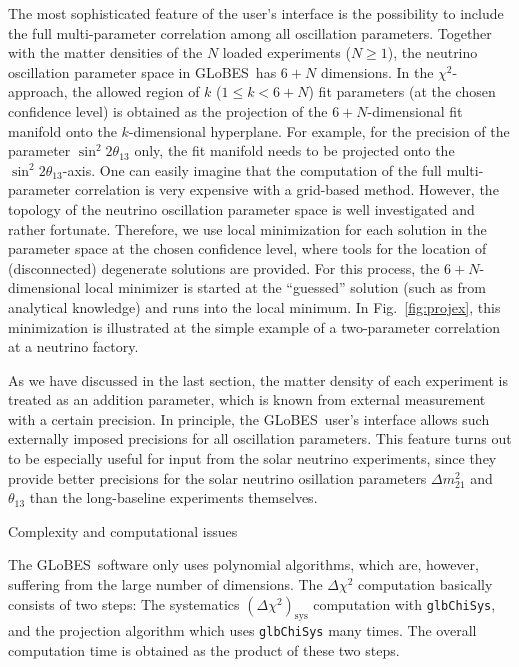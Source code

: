 \documentclass[12pt,a4paper]{article}
\makeatletter
\renewcommand{\section}{\@startsection{section}{1}{0em}{-\baselineskip}%
{\baselineskip}{\normalfont\large\bfseries}}
\newcommand{\fig}{Fig.}
\newcommand{\sdm}{\Delta m_{21}^2}
\newcommand{\stheta}{\sin^2 2 \theta_{13}}
\newcommand{\GLOBES}{{\sf GLoBES}}
\newcommand{\figu}[1]{\fig~\ref{fig:#1}}
\makeatother
\begin{document}
The most sophisticated feature of the user's interface is the
possibility to include the full multi-parameter correlation among
all oscillation parameters. Together with the matter densities
of the $N$ loaded experiments ($N \ge 1$), the neutrino oscillation parameter space in \GLOBES\ has $6+N$ dimensions. In the $\chi^2$-approach,
the allowed region of $k$ ($1\le k<6+N$) fit parameters (at the chosen confidence level) is obtained as the projection of the $6+N$-dimensional fit manifold onto the $k$-dimensional hyperplane. For example,
for the precision of the parameter $\stheta$ only, the fit manifold
needs to be projected onto the $\stheta$-axis. One can easily imagine
that the computation of the full multi-parameter correlation is
very expensive with a grid-based method. However, the topology
of the neutrino oscillation parameter space is well investigated and
rather fortunate. Therefore, we use local minimization for each
solution in the parameter space at the chosen confidence level,
where tools for the location of (disconnected) degenerate solutions 
are provided. For this process, the $6+N$-dimensional local minimizer
is started at the ``guessed'' solution (such as from analytical 
knowledge) and runs into the local minimum. In \figu{projex},
this minimization is illustrated at the simple example of a 
two-parameter correlation at a neutrino factory.

As we have discussed in the last section, the matter density of
each experiment is treated as an addition parameter, which is known
from external measurement with a certain precision. In principle, 
the \GLOBES\ user's interface allows such externally imposed
precisions for all oscillation parameters. This feature turns out
to be especially useful for input from the solar neutrino experiments,
since they provide better precisions for the solar neutrino
osillation parameters $\sdm$ and $\theta_{13}$ than the long-baseline
 experiments themselves.

\section{Complexity and computational issues}

The \GLOBES\ software only uses polynomial algorithms, which are,
however, suffering from the large number of dimensions.
The $\Delta \chi^2$ computation basically consists of two steps:
The systematics $(\Delta \chi^2)_{\mathrm{sys}}$ computation with {\tt glbChiSys},
and the projection algorithm which uses {\tt glbChiSys} many times. 
The overall computation time is obtained as the product of these two steps.
\end{document}
